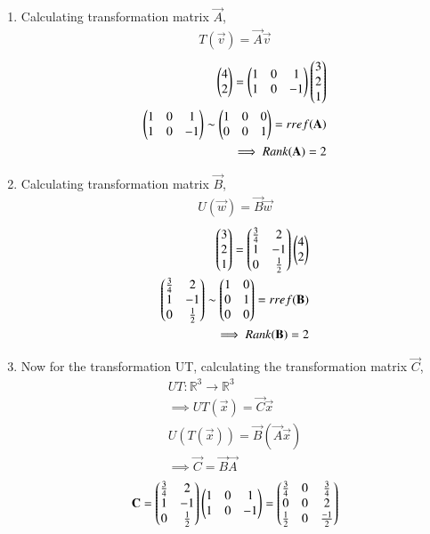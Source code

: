 \begin{enumerate}
\item Calculating transformation matrix $\vec{A}$,
\begin{align}
T(\vec{v})=\vec{A}\vec{v}
\end{align}
\begin{align}
\begin{pmatrix}4\\2\end{pmatrix}=\begin{pmatrix}1&0&1\\1&0&-1\end{pmatrix}\begin{pmatrix}3\\2\\1\end{pmatrix}\\
\begin{pmatrix}1&0&1\\1&0&-1\end{pmatrix} \sim \begin{pmatrix}1&0&0\\0&0&1\end{pmatrix}=rref(\mathbf{A})\\
\implies Rank(\mathbf{A})=2 \label{eq:solutions/3/2/6/RankA}
\end{align}
\item Calculating transformation matrix $\vec{B}$, 
\begin{align}
U(\vec{w})=\vec{B}\vec{w}
\end{align}
\begin{align}
\begin{pmatrix}3\\2\\1\end{pmatrix}=\begin{pmatrix}\frac{3}{4}&2\\1&-1\\0&\frac{1}{2}\end{pmatrix}\begin{pmatrix}4\\2\end{pmatrix}\\
\begin{pmatrix}\frac{3}{4}&2\\1&-1\\0&\frac{1}{2}\end{pmatrix} \sim \begin{pmatrix}1&0\\0&1\\0&0\end{pmatrix}=rref(\mathbf{B})\\
\implies Rank(\mathbf{B})=2 \label{eq:solutions/3/2/6/RankB}
\end{align}
\item Now for the transformation UT, calculating the transformation matrix $\vec{C}$,
\begin{align}
UT:\mathbb{R}^3\rightarrow\mathbb{R}^3\\
\implies UT(\vec{x})=\vec{C}\vec{x}\\
U(T(\vec{x}))=\vec{B}(\vec{A}\vec{x})\\
\implies \vec{C}=\vec{B}\vec{A}
\end{align}
\begin{align}
\vec{C}=\myvec{\frac{3}{4}&2\\1&-1\\0&\frac{1}{2}}\myvec{1&0&1\\1&0&-1}=\myvec{\frac{3}{4}&0&\frac{3}{4}\\0&0&2\\\frac{1}{2}&0&\frac{-1}{2}}\\

\end{align}
\end{enumerate}
